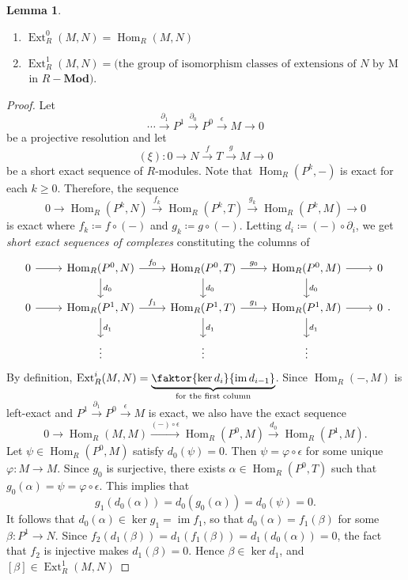 \documentclass[10pt,letterpaper,cm]{nupset}
\theoremstyle{definition}
\newtheorem{lemma}{Lemma}
\newcommand{\1}{\mathbf{1}}
\newcommand{\0}{\vec 0}
\DeclareMathOperator{\ext}{Ext}
\DeclareMathOperator{\im}{im}
\DeclareMathOperator{\Hom}{Hom}
\begin{document}
\begin{lemma} $ $
\begin{enumerate}
\item $\ext^0_R(M, N) = \Hom_R(M, N)$
\item $\ext^1_R(M, N) = \big ( \text{the group of isomorphism classes of extensions of } N \text{ by } $M$\text{ in } R{-}\mathbf{Mod}    \big )$.
\end{enumerate}                                                                                                \end{lemma}
\begin{proof}
Let $$\cdots \overset{\partial_1}{\longrightarrow} P^1 \overset{\partial_0}{\longrightarrow} P^0  \overset{\epsilon}{\longrightarrow} M \to 0$$ be a projective resolution and
let $$(\xi) : 0 \to N \overset{f}{\longrightarrow} T \overset{g}{\longrightarrow} M \to 0$$ be a short exact sequence of $R$-modules.
Note that $\Hom_R(P^k, -)$ is exact for each $k\geq 0$. Therefore, the sequence $$ 0 \to \Hom_R(P^k, N) \overset{f_k}{\longrightarrow} \Hom_R(P^k, T) \overset{g_k}{\longrightarrow} \Hom_R(P^k, M) \to 0   $$ is exact where $f_k \coloneqq  f\circ (-)$ and $g_k \coloneqq  g \circ (-)$. Letting $d_i \coloneqq  (-)\circ \partial_i$, we get \textit{short exact sequences of complexes} constituting the columns of 
\[
\begin{tikzcd}
0 \arrow[r] & {\Hom_R(P^0, N)} \arrow[r, "f_0"] \arrow[d, "d_0"] & {\Hom_R(P^0, T)} \arrow[r, "g_0"] \arrow[d, "d_0"] & {\Hom_R(P^0, M)} \arrow[r] \arrow[d, "d_0"] & 0 \\
0 \arrow[r] & {\Hom_R(P^1, N)} \arrow[r, "f_1"] \arrow[d, "d_1"] & {\Hom_R(P^1, T)} \arrow[r, "g_1"] \arrow[d, "d_1"] & {\Hom_R(P^1, M)} \arrow[r] \arrow[d, "d_1"] & 0 \\
 & \vdots & \vdots & \vdots & 
\end{tikzcd}
.\]
By definition, $\ext_R^i(M, N) = \underbrace{\faktor{\ker{d_i}}{\im{d_{i-1}}}}_{\text{for the first column}}$. Since $\Hom_R(-, M)$ is left-exact and $P^1 \overset{\partial_1}{\longrightarrow} P^0 \overset{\epsilon}{\longrightarrow} M$ is exact, we also have the exact sequence $$ 0 \to \Hom_R(M, M) \overset{(-) \circ \epsilon}{\longrightarrow} \Hom_R(P^0, M) \overset{d_0}{\longrightarrow} \Hom_R(P^1, M) .  $$ 
Let $\psi \in \Hom_R(P^0, M)$ satisfy $d_0(\psi) =0$. Then $\psi = \varphi \circ \epsilon$ for some unique $\varphi : M\to M$. Since $g_0$ is surjective, there exists $\alpha \in \Hom_R(P^0, T)$ such that $g_0(\alpha) = \psi = \varphi \circ \epsilon $. This implies that $$g_1(d_0(\alpha)) = d_0(g_0(\alpha)) = d_0(\psi) =0.$$ It follows that $d_0(\alpha) \in \ker{g_1} = \im{f_1}$, so that $d_0(\alpha) = f_1(\beta)$ for some $\beta : P^1 \to N$. Since $f_2(d_1(\beta))=d_1(f_1(\beta))= d_1(d_0(\alpha)) = 0$, the fact that $f_2$ is injective makes $d_1(\beta) =0$. Hence $\beta \in \ker{d_1}$, and $[\beta] \in \ext^1_R(M, N)$ 

\end{proof}
\end{document}
